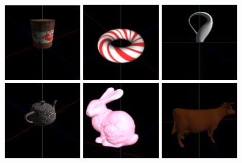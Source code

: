 \documentclass[12pt, a4paper]{article}
\begin{document}
\begin{figure}[H]
    \centering
    \includegraphics[width=0.3\textwidth]{res/phase4/results/CylinderMultiTexture.png}
    \includegraphics[width=0.3\textwidth]{res/phase4/results/Torus.png}
    \includegraphics[width=0.3\textwidth]{res/phase4/results/KleinBottle.png}
    \includegraphics[width=0.3\textwidth]{res/phase4/results/Teapot.png}
    \includegraphics[width=0.3\textwidth]{res/phase4/results/Bunny.png}
    \includegraphics[width=0.3\textwidth]{res/phase4/results/Cow.png}

\end{figure}
\end{document}
